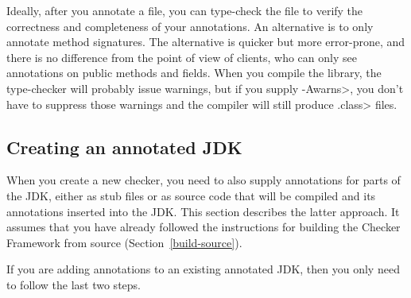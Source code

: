 Ideally, after you annotate a file, you can type-check the file to verify
the correctness and completeness of your annotations.  An alternative is to
only annotate method signatures.  The alternative is quicker but more
error-prone, and there is no difference from the point of view of clients,
who can only see annotations on public methods and fields.  When you
compile the library, the type-checker will probably issue warnings, but if
you supply \<-Awarns>, you don't have to suppress those warnings and the
compiler will still produce \<.class> files.


\subsection{Creating an annotated JDK\label{annotating-jdk}}

When you create a new checker, you need to also supply annotations for
parts of the JDK, either as stub files or as source code that will be
compiled and its annotations inserted into the JDK\@.  This
section describes the latter approach.
It assumes that you have already followed the instructions for building the
Checker Framework from source (Section~\ref{build-source}).

If you are adding annotations to an existing annotated JDK, then you only
need to follow the last two steps.

